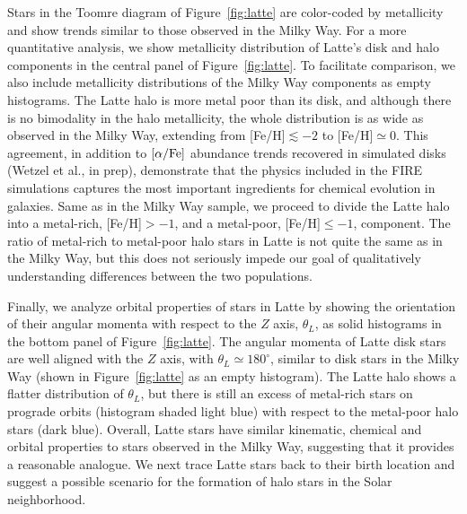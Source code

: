 \documentclass[apj, twocolappendix, numberedappendix, appendixfloats]{emulateapj}
\begin{document}
Stars in the Toomre diagram of Figure~\ref{fig:latte} are color-coded by metallicity and show trends similar to those observed in the Milky Way.
For a more quantitative analysis, we show metallicity distribution of Latte's disk and halo components in the central panel of Figure~\ref{fig:latte}.
To facilitate comparison, we also include metallicity distributions of the Milky Way components as empty histograms.
The Latte halo is more metal poor than its disk, and although there is no bimodality in the halo metallicity, the whole distribution is as wide as observed in the Milky Way, extending from [Fe/H]$\lesssim-2$ to [Fe/H]$\simeq0$.
This agreement, in addition to $\rm[\alpha/Fe]$ abundance trends recovered in simulated disks (Wetzel et al., in prep), demonstrate that the physics included in the FIRE simulations captures the most important ingredients for chemical evolution in galaxies.
Same as in the Milky Way sample, we proceed to divide the Latte halo into a metal-rich, [Fe/H]$>-1$, and a metal-poor, [Fe/H]$\leq-1$, component.
The ratio of metal-rich to metal-poor halo stars in Latte is not quite the same as in the Milky Way, but this does not seriously impede our goal of qualitatively understanding differences between the two populations.

Finally, we analyze orbital properties of stars in Latte by showing the orientation of their angular momenta with respect to the $Z$ axis, $\theta_L$, as solid histograms in the bottom panel of Figure~\ref{fig:latte}.
The angular momenta of Latte disk stars are well aligned with the $Z$ axis, with $\theta_L\simeq180^\circ$, similar to disk stars in the Milky Way (shown in Figure~\ref{fig:latte} as an empty histogram).
The Latte halo shows a flatter distribution of $\theta_L$, but there is still an excess of metal-rich stars on prograde orbits (histogram shaded light blue) with respect to the metal-poor halo stars (dark blue).
Overall, Latte stars have similar kinematic, chemical and orbital properties to stars observed in the Milky Way, suggesting that it provides a reasonable analogue.
We next trace Latte stars back to their birth location and suggest a possible scenario for the formation of halo stars in the Solar neighborhood.
\end{document}
